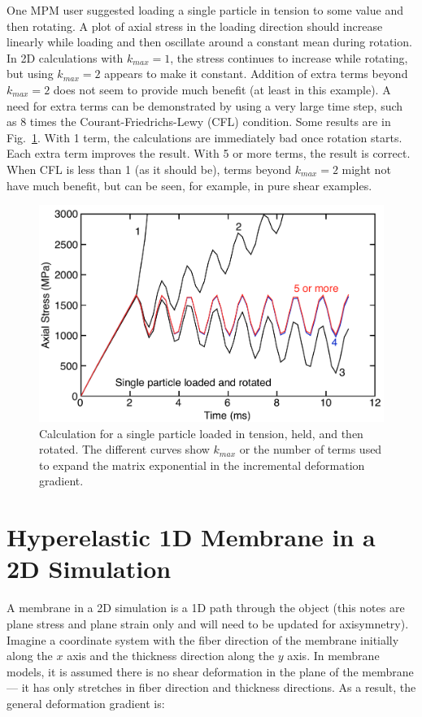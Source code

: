\documentclass[11pt]{book}
\begin{document}
One MPM user suggested loading a single particle in tension to some value and then rotating. A plot of axial stress in the loading direction should increase linearly while loading and then oscillate around a constant mean during rotation. In 2D calculations with $k_{max}=1$, the stress continues to increase while rotating, but using $k_{max}=2$ appears to make it constant. Addition of extra terms beyond $k_{max}=2$ does not seem to provide much benefit (at least in this example). A need for extra terms can be demonstrated by using a very large time step, such as 8 times the Courant-Friedrichs-Lewy (CFL) condition. Some results are in Fig.~\ref{dFCalc}. With 1 term, the calculations are immediately bad once rotation starts. Each extra term improves the result. With 5 or more terms, the result is correct. When CFL is less than 1 (as it should be), terms beyond $k_{max}=2$ might not have much benefit, but can be seen, for example, in pure shear examples.
\begin{figure}
\begin{center}
\includegraphics[width=5in]{IncrementalDef}
\caption{Calculation for a single particle loaded in tension, held, and then rotated. The different curves show $k_{max}$ or the number of terms used to expand the matrix exponential in the incremental deformation gradient.}
\label{dFCalc}
\end{center}
\end{figure}

\section{Hyperelastic 1D Membrane in a 2D Simulation}

A membrane in a 2D simulation is a 1D path through the object (this notes are plane stress and plane strain only and will need to be updated for axisymnetry). Imagine a coordinate system with the fiber direction of the membrane initially along the $x$ axis and the thickness direction along the $y$ axis. In membrane models, it is assumed there is no shear deformation in the plane of the membrane --- it has only stretches in fiber direction and thickness directions. As a result, the general deformation gradient is:
\end{document}
